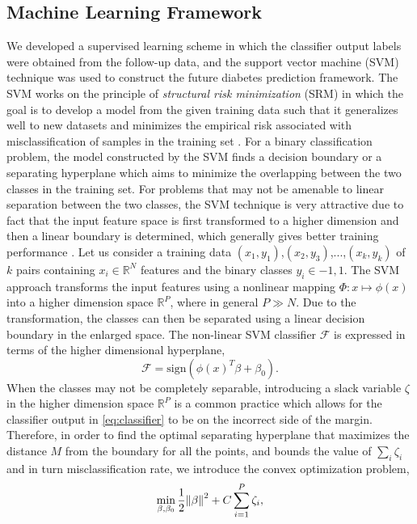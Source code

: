 \documentclass[journal,comsoc]{IEEEtran}
\renewcommand{\^}{\hat}  %
\begin{document}
\subsection{Machine Learning Framework}
%
We developed a supervised learning scheme in which the classifier output labels were obtained from the follow-up data, and the support vector machine (SVM) technique was used to construct  the future diabetes prediction framework. The SVM works on the principle of \emph{structural risk minimization} (SRM) in which the goal is to develop a model from the given training data such that it generalizes well to new datasets and minimizes the empirical risk associated with misclassification of samples in the training set \cite{vapnik_nature_2000,vapnik2015uniform}. For a binary classification problem, the model constructed by the SVM finds a decision boundary or a separating hyperplane which aims to minimize the overlapping between the two classes in the training set. For problems that may not be amenable to linear separation between the two classes, the SVM technique is very attractive due to fact that the input feature space is first transformed to a higher dimension and then a linear boundary is determined, which generally gives better training performance \cite{friedman2001elements}. Let us consider a training data $(x_1, y_1)$,$(x_2, y_3)$,...,$(x_k, y_k)$ of $k$  pairs containing $x_i \in \mathbb R^N$ features and the binary classes $y_i \in {-1, 1}$. The SVM approach transforms the input features using a nonlinear mapping $\Phi : x \mapsto \phi(x)$ into a higher dimension space $\mathbb R^P$, where in general $P \gg N$. Due to the transformation, the classes can then be separated using a linear decision boundary in the enlarged space. The non-linear SVM classifier $\mathcal F$ is expressed in terms of the higher dimensional hyperplane,
%
\begin{equation}
  \mathcal F = \mathrm{sign} \left( \phi(x)^T \beta + \beta_0 \right).
  \label{eq:classifier}
\end{equation}
%
When the classes may not be completely separable, introducing a slack variable $\zeta$ in the higher dimension space $\mathbb R^P$ is a common practice which allows for the classifier output in \eqref{eq:classifier} to be on the incorrect side of the margin.
Therefore, in order to find the optimal separating hyperplane that maximizes the distance $M$ from the boundary for all the points, and bounds the value of $\sum_{i}{\zeta_i}$ and in turn misclassification rate, we introduce the convex optimization problem,
%
\begin{equation}
  \min_{\beta, \beta_0} \frac{1}{2} \norm{\beta}^2 + C\sum_{i=1}^{P} \zeta_i,
  \label{eq:min}
\end{equation}
\end{document}
